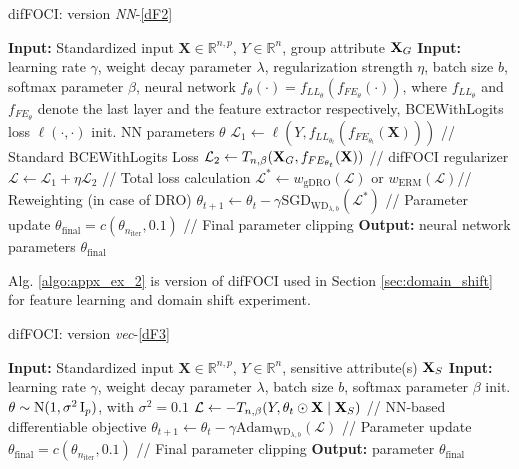\begin{algorithm}[ht]
\caption{difFOCI: version \textit{NN}-\ref{dF2}}
\begin{algorithmic}
\STATE \textbf{Input:} Standardized input $\mathbf{X}\in\mathbb{R}^{n,p}$, $Y\in\mathbb{R}^n$, group attribute $\mathbf{X}_G$
\STATE \textbf{Input:} learning rate $\gamma$, weight decay parameter $\lambda$, regularization strength $\eta$, batch size $b$, softmax parameter $\beta$, neural network $f_\theta(\cdot)=f_{LL_\theta}(f_{FE_\theta}(\cdot))$, where $f_{LL_\theta}$ and $f_{FE_\theta}$ denote the last layer and the feature extractor respectively, BCEWithLogits loss $\ell(\cdot, \cdot)$
\STATE init. NN parameters $\theta$ 
    \STATE $\mathcal{L}_1 \gets \ell(Y, f_{LL_{\theta_t}}(f_{FE_{\theta_t}}(\mathbf{X})))$ \hfill // Standard BCEWithLogits Loss
    \STATE $\mathcal{L}_2 \gets T_{n, \beta}(\mathbf{X}_G, f_{FE_{\theta_t}}(\mathbf{X}))$ \hfill // difFOCI regularizer
    \STATE $\mathcal{L} \gets \mathcal{L}_1 + \eta \mathcal{L}_2$ \hfill // Total loss calculation
    \STATE $\mathcal{L}^* \gets w_\text{gDRO} (\mathcal{L}) \text{ or } w_\text{ERM} (\mathcal{L}) $\hfill // Reweighting (in case of DRO)
    \STATE $\theta_{t+1} \gets \theta_t - \gamma \text{SGD}_{\text{WD}_{ \lambda, b}} (\mathcal{L}^*)$   \hfill // Parameter update
\ENDFOR
\STATE $\theta_{\text{final}} = c(\theta_{n_{\text{iter}}}, 0.1)$ \hfill // Final parameter clipping
\STATE \textbf{Output:} neural network parameters $\theta_{\text{final}}$ 
\end{algorithmic}
\label{algo:appx_ex_2}
\end{algorithm} 

Alg. \ref{algo:appx_ex_2} is version of difFOCI used in Section \ref{sec:domain_shift} for feature learning and domain shift experiment.

\begin{algorithm}[ht]
\caption{difFOCI: version \textit{vec}-\ref{dF3}}
\begin{algorithmic}
\STATE \textbf{Input:} Standardized input $\mathbf{X}\in\mathbb{R}^{n,p}$, $Y\in\mathbb{R}^n$, sensitive attribute(s) $\mathbf{X}_S$
\STATE \textbf{Input:} learning rate $\gamma$, weight decay parameter $\lambda$, batch size $b$, softmax parameter $\beta$
\STATE init. $\theta\sim \mathrm{N}(1, \sigma^2\operatorname{I}_p)$, with $\sigma^2=0.1$ 
    \STATE $\mathcal{L} \gets -T_{n, \beta}(Y, \mathbf{\theta}_t\odot \mathbf{X}\mid \mathbf{X}_S)$ \hfill // NN-based differentiable objective
    \STATE $\theta_{t+1} \gets \theta_t - \gamma \text{Adam}_{\text{WD}_{ \lambda, b}} (\mathcal{L})$   \hfill // Parameter update
\ENDFOR
\STATE $\theta_{\text{final}} = c(\theta_{n_{\text{iter}}}, 0.1)$ \hfill // Final parameter clipping
\STATE \textbf{Output:} parameter $\theta_{\text{final}}$
\end{algorithmic}
\label{algo:appx_ex_3}
\end{algorithm} 

